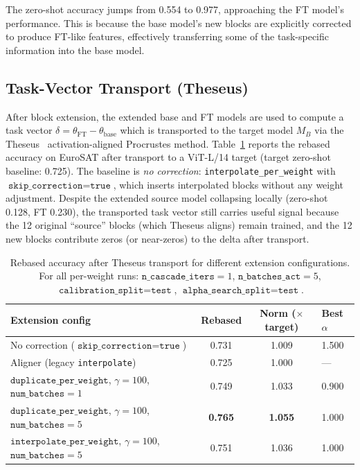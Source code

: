 \documentclass[11pt,a4paper]{article}
\begin{document}
The zero-shot accuracy jumps from 0.554 to 0.977, approaching the FT model's
performance. This is because the base model's new blocks are explicitly
corrected to produce FT-like features, effectively transferring some of the
task-specific information into the base model.

\subsection{Task-Vector Transport (Theseus)}
\label{subsec:transport}

After block extension, the extended base and FT models are used to compute
a task vector $\delta = \theta_{\text{FT}} - \theta_{\text{base}}$ which is
transported to the target model $M_B$ via the Theseus~\cite{theseus}
activation-aligned Procrustes method. Table~\ref{tab:transport} reports the
rebased accuracy on EuroSAT after transport to a ViT-L/14 target (target
zero-shot baseline: 0.725). The baseline is \emph{no correction}:
\texttt{interpolate\_per\_weight} with $\texttt{skip\_correction}=\texttt{true}$,
which inserts interpolated blocks without any weight adjustment. Despite the
extended source model collapsing locally (zero-shot 0.128, FT 0.230),
the transported task vector still carries useful signal because the
12 original ``source'' blocks (which Theseus aligns) remain trained, and
the 12 new blocks contribute zeros (or near-zeros) to the delta after
transport.

\begin{table}[ht]
\centering
\caption{Rebased accuracy after Theseus transport for different extension
configurations. For all per-weight runs:
$\texttt{n\_cascade\_iters}=1$, $\texttt{n\_batches\_act}=5$,
$\texttt{calibration\_split}=\texttt{test}$,
$\texttt{alpha\_search\_split}=\texttt{test}$.}
\label{tab:transport}
\begin{tabular}{lccl}
\toprule
Extension config & Rebased & Norm ($\times$target) & Best $\alpha$ \\
\midrule
No correction ($\texttt{skip\_correction}=\texttt{true}$) & 0.731 & 1.009 & 1.500 \\
Aligner (legacy \texttt{interpolate}) & 0.725 & 1.000 & --- \\
$\texttt{duplicate\_per\_weight}$, $\gamma=100$, $\texttt{num\_batches}=1$ & 0.749 & 1.033 & 0.900 \\
$\texttt{duplicate\_per\_weight}$, $\gamma=100$, $\texttt{num\_batches}=5$ & \textbf{0.765} & \textbf{1.055} & 1.000 \\
$\texttt{interpolate\_per\_weight}$, $\gamma=100$, $\texttt{num\_batches}=5$ & 0.751 & 1.036 & 1.000 \\
\bottomrule
\end{tabular}
\end{table}
\end{document}
